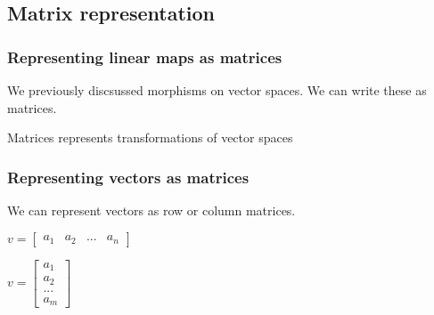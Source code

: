 
\subsection{Matrix representation}

\subsubsection{Representing linear maps as matrices}

We previously discsussed morphisms on vector spaces. We can write these as matrices.

Matrices represents transformations of vector spaces

\subsubsection{Representing vectors as matrices}

We can represent vectors as row or column matrices.

\(v=\begin{bmatrix}a_{1} & a_{2}&...&a_{n}\end{bmatrix}\)

\(v=\begin{bmatrix}a_{1}\\a_{2}\\...\\a_{m}\end{bmatrix}\)

